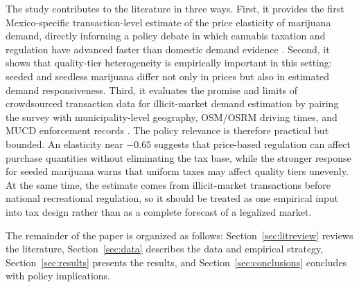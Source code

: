 The study contributes to the literature in three ways.  First, it provides the first Mexico-specific transaction-level estimate of the price elasticity of marijuana demand, directly informing a policy debate in which cannabis taxation and regulation have advanced faster than domestic demand evidence \citep{perezromero2014elementos,clavellina2020cannabis_taxes,senado2021minuta}.  Second, it shows that quality-tier heterogeneity is empirically important in this setting: seeded and seedless marijuana differ not only in prices but also in estimated demand responsiveness.  Third, it evaluates the promise and limits of crowdsourced transaction data for illicit-market demand estimation by pairing the survey with municipality-level geography, OSM/OSRM driving times, and MUCD enforcement records \citep{davis2016crowd,halcoussis2017geo,riley2020southafrica}.  The policy relevance is therefore practical but bounded.  An elasticity near $-0.65$ suggests that price-based regulation can affect purchase quantities without eliminating the tax base, while the stronger response for seeded marijuana warns that uniform taxes may affect quality tiers unevenly.  At the same time, the estimate comes from illicit-market transactions before national recreational regulation, so it should be treated as one empirical input into tax design rather than as a complete forecast of a legalized market.

The remainder of the paper is organized as follows: Section~\ref{sec:litreview} reviews the literature, Section~\ref{sec:data} describes the data and empirical strategy, Section~\ref{sec:results} presents the results, and Section~\ref{sec:conclusions} concludes with policy implications.
